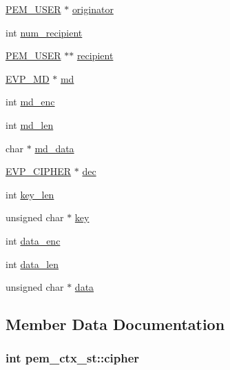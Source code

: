 \begin{DoxyCompactItemize}
\begin{tabbing}
\end{tabbing}\item 
\hyperlink{pem_8h_af4a17a304b13fbfbf4af1bcb2a3a22b4}{P\+E\+M\+\_\+\+U\+S\+ER} $\ast$ \hyperlink{structpem__ctx__st_af7c7d2c215c91227ee7f1480af2d33df}{originator}
\item 
int \hyperlink{structpem__ctx__st_a0efb31608f13a8faf991385d6bd9d788}{num\+\_\+recipient}
\item 
\hyperlink{pem_8h_af4a17a304b13fbfbf4af1bcb2a3a22b4}{P\+E\+M\+\_\+\+U\+S\+ER} $\ast$$\ast$ \hyperlink{structpem__ctx__st_afa0b3aa999aedfd5e6feb3033a818cca}{recipient}
\item 
\hyperlink{ossl__typ_8h_aac66cf010326fa9a927c2a34888f45d3}{E\+V\+P\+\_\+\+MD} $\ast$ \hyperlink{structpem__ctx__st_ab27fcbc00038a731e6a73846db8eb9a1}{md}
\item 
int \hyperlink{structpem__ctx__st_a84e1ec0487b7a71cd941858d667c91ec}{md\+\_\+enc}
\item 
int \hyperlink{structpem__ctx__st_ab6ce4983829da473db829d6a620e663d}{md\+\_\+len}
\item 
char $\ast$ \hyperlink{structpem__ctx__st_a9cfdebfaf0e986b87cfe5b8ac80376da}{md\+\_\+data}
\item 
\hyperlink{ossl__typ_8h_a54a8663a8084d45c31f2786156b55405}{E\+V\+P\+\_\+\+C\+I\+P\+H\+ER} $\ast$ \hyperlink{structpem__ctx__st_a72c11edeac11bde0c3de61b6d2547d75}{dec}
\item 
int \hyperlink{structpem__ctx__st_a96d2bba210ec4b53db3917f08ef8da64}{key\+\_\+len}
\item 
unsigned char $\ast$ \hyperlink{structpem__ctx__st_a04828e1e74f1ef05345ed12d75933fd7}{key}
\item 
int \hyperlink{structpem__ctx__st_a24116aab3153216d3d3692db34bb1d6d}{data\+\_\+enc}
\item 
int \hyperlink{structpem__ctx__st_a52bb16434d30404e5678b162b7a3e75b}{data\+\_\+len}
\item 
unsigned char $\ast$ \hyperlink{structpem__ctx__st_a15db0e222afb61994640814a0a5555cb}{data}
\end{DoxyCompactItemize}


\subsection{Member Data Documentation}
\subsubsection[{\texorpdfstring{cipher}{cipher}}]{\setlength{\rightskip}{0pt plus 5cm}int pem\+\_\+ctx\+\_\+st\+::cipher}\hypertarget{structpem__ctx__st_a759a129c105dd59ab18162b07e81bbe1}{}\label{structpem__ctx__st_a759a129c105dd59ab18162b07e81bbe1}
